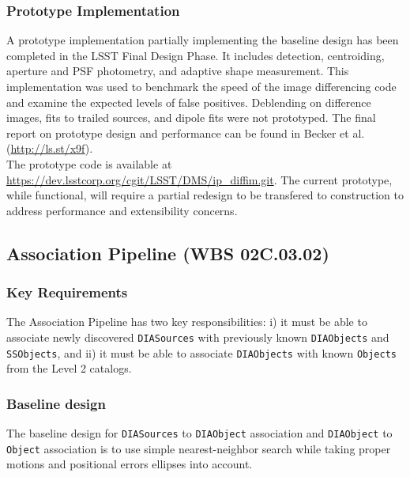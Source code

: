 \documentclass[12pt]{article}
\newcommand{\code}[1]{\texttt{#1}}
\newcommand{\DIASources}{\code{DIASources}\xspace}
\newcommand{\DIAObject}{\code{DIAObject}\xspace}
\newcommand{\DIAObjects}{\code{DIAObjects}\xspace}
\newcommand{\Object}{\code{Object}\xspace}
\newcommand{\Objects}{\code{Objects}\xspace}
\newcommand{\SSObjects}{\code{SSObjects}\xspace}
\newcommand{\wbsAssocP}{WBS 02C.03.02}
\begin{document}
\subsubsection{Prototype Implementation}

A prototype implementation partially implementing the baseline design has been completed in the LSST Final Design Phase. It includes detection, centroiding, aperture and PSF photometry, and adaptive shape measurement.
This implementation was used to benchmark the speed of the image differencing code and examine the expected levels of false positives. Deblending on difference images, fits to trailed sources, and dipole fits were not prototyped. The final report on prototype design and performance can be found in Becker et al. (\url{http://ls.st/x9f}).
\\

The prototype code is available at \url{https://dev.lsstcorp.org/cgit/LSST/DMS/ip_diffim.git}. The current prototype, while functional, will require a partial redesign to be transfered to construction to address performance and extensibility concerns.

\clearpage

\subsection{Association Pipeline (\wbsAssocP)}

\subsubsection{Key Requirements}

The Association Pipeline has two key responsibilities: i) it must be able to associate newly discovered \DIASources with previously known \DIAObjects and \SSObjects, and ii) it must be able to associate \DIAObjects with known \Objects from the Level 2 catalogs.

\subsubsection{Baseline design}

The baseline design for \DIASources to \DIAObject association and \DIAObject to \Object association is to use simple nearest-neighbor search while taking proper motions and positional errors ellipses into account.
\end{document}
